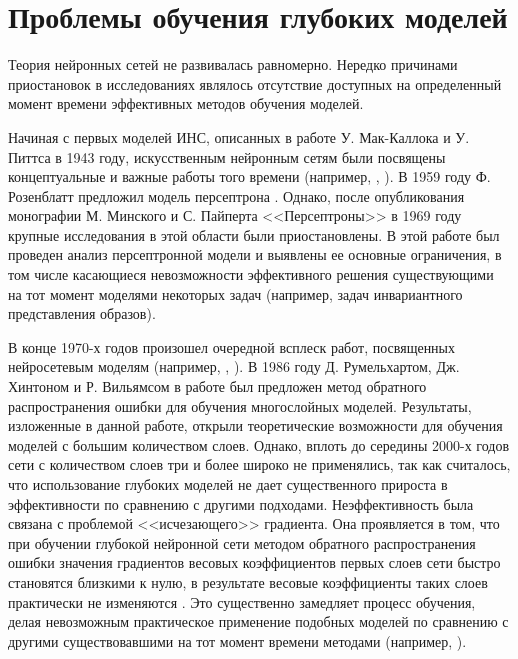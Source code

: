 
\section{Проблемы обучения глубоких моделей}

Теория нейронных сетей не развивалась равномерно. Нередко причинами приостановок в исследованиях являлось отсутствие доступных на определенный момент времени эффективных методов обучения моделей. 

Начиная с первых моделей ИНС, описанных в работе У. Мак-Каллока и У. Питтса \cite{mcculloch43a} в 1943 году, искусственным нейронным сетям были посвящены концептуальные и важные работы того времени (например, \cite{hebb1949}, \cite{widrow1960}). В 1959 году Ф. Розенблатт предложил модель персептрона \cite{rosenblatt1959}. Однако, после опубликования монографии М. Минского и С. Пайперта <<Персептроны>> в 1969 году \cite{minsky69perceptrons} крупные исследования в этой области были приостановлены. В этой работе был проведен анализ персептронной модели и выявлены ее основные ограничения, в том числе касающиеся невозможности эффективного решения существующими на тот момент моделями некоторых задач (например, задач инвариантного представления образов). %

В конце 1970-х годов произошел очередной всплеск работ, посвященных нейросетевым моделям (например, \cite{Grossberg1976}, \cite{Kohonen1977}).
В 1986 году Д. Румельхартом, Дж. Хинтоном и Р. Вильямсом в работе \cite{rumelhart1986learning} был предложен метод обратного распространения ошибки для обучения многослойных моделей. Результаты, изложенные в данной работе, открыли теоретические возможности для обучения моделей с большим количеством слоев.  Однако, вплоть до середины 2000-х годов сети с количеством слоев три и более широко не применялись, так как считалось, что использование глубоких моделей не дает существенного прироста в эффективности по сравнению с другими подходами. Неэффективность была связана с проблемой <<исчезающего>> градиента. Она проявляется в том, что при обучении глубокой нейронной сети методом обратного распространения ошибки значения градиентов весовых коэффициентов первых слоев сети быстро становятся близкими к нулю, в результате весовые коэффициенты таких слоев практически не изменяются \cite{n5}. Это существенно замедляет процесс обучения, делая невозможным практическое применение подобных моделей по сравнению с другими существовавшими на тот момент времени методами (например, \cite{Corinna1995}).

